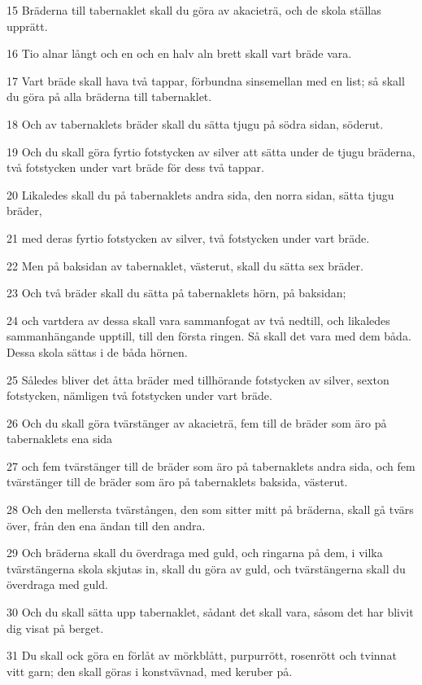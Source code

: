 \par 15 Bräderna till tabernaklet skall du göra av akacieträ, och de skola ställas upprätt.
\par 16 Tio alnar långt och en och en halv aln brett skall vart bräde vara.
\par 17 Vart bräde skall hava två tappar, förbundna sinsemellan med en list; så skall du göra på alla bräderna till tabernaklet.
\par 18 Och av tabernaklets bräder skall du sätta tjugu på södra sidan, söderut.
\par 19 Och du skall göra fyrtio fotstycken av silver att sätta under de tjugu bräderna, två fotstycken under vart bräde för dess två tappar.
\par 20 Likaledes skall du på tabernaklets andra sida, den norra sidan, sätta tjugu bräder,
\par 21 med deras fyrtio fotstycken av silver, två fotstycken under vart bräde.
\par 22 Men på baksidan av tabernaklet, västerut, skall du sätta sex bräder.
\par 23 Och två bräder skall du sätta på tabernaklets hörn, på baksidan;
\par 24 och vartdera av dessa skall vara sammanfogat av två nedtill, och likaledes sammanhängande upptill, till den första ringen. Så skall det vara med dem båda. Dessa skola sättas i de båda hörnen.
\par 25 Således bliver det åtta bräder med tillhörande fotstycken av silver, sexton fotstycken, nämligen två fotstycken under vart bräde.
\par 26 Och du skall göra tvärstänger av akacieträ, fem till de bräder som äro på tabernaklets ena sida
\par 27 och fem tvärstänger till de bräder som äro på tabernaklets andra sida, och fem tvärstänger till de bräder som äro på tabernaklets baksida, västerut.
\par 28 Och den mellersta tvärstången, den som sitter mitt på bräderna, skall gå tvärs över, från den ena ändan till den andra.
\par 29 Och bräderna skall du överdraga med guld, och ringarna på dem, i vilka tvärstängerna skola skjutas in, skall du göra av guld, och tvärstängerna skall du överdraga med guld.
\par 30 Och du skall sätta upp tabernaklet, sådant det skall vara, såsom det har blivit dig visat på berget.
\par 31 Du skall ock göra en förlåt av mörkblått, purpurrött, rosenrött och tvinnat vitt garn; den skall göras i konstvävnad, med keruber på.
